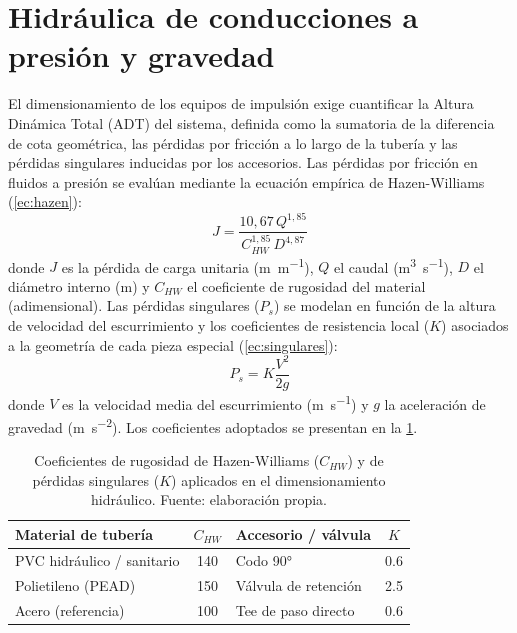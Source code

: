 \section{Hidráulica de conducciones a presión y gravedad}
\label{sec:mt-hidraulico}

El dimensionamiento de los equipos de impulsión exige cuantificar la Altura Dinámica Total (ADT) del sistema, definida como la sumatoria de la diferencia de cota geométrica, las pérdidas por fricción a lo largo de la tubería y las pérdidas singulares inducidas por los accesorios.
Las pérdidas por fricción en fluidos a presión se evalúan mediante la ecuación empírica de Hazen-Williams (\cref{ec:hazen}):
\begin{equation}
  J = \frac{10{,}67\, Q^{1{,}85}}{C_{HW}^{1{,}85}\, D^{4{,}87}}
  \label{ec:hazen}
\end{equation}
donde $J$ es la pérdida de carga unitaria (\unit{\meter\per\meter}), $Q$ el caudal (\unit{\cubic\meter\per\second}), $D$ el diámetro interno (\unit{\meter}) y $C_{HW}$ el coeficiente de rugosidad del material (adimensional).
Las pérdidas singulares ($P_s$) se modelan en función de la altura de velocidad del escurrimiento y los coeficientes de resistencia local ($K$) asociados a la geometría de cada pieza especial (\cref{ec:singulares}):
\begin{equation}
  P_s = K \frac{V^2}{2g}
  \label{ec:singulares}
\end{equation}
donde $V$ es la velocidad media del escurrimiento (\unit{\meter\per\second}) y $g$ la aceleración de gravedad (\unit{\meter\per\square\second}).
Los coeficientes adoptados se presentan en la \cref{tab:coeficientes-hidraulicos}.

\begin{table}[htbp]
  \centering
  \caption{Coeficientes de rugosidad de Hazen-Williams ($C_{HW}$) y de pérdidas singulares ($K$) aplicados en el dimensionamiento hidráulico. Fuente: elaboración propia.}
  \label{tab:coeficientes-hidraulicos}
  \begin{tabular}{lclc}
    \toprule
    Material de tubería & $C_{HW}$ & Accesorio / válvula & $K$ \\
    \midrule
    PVC hidráulico / sanitario & 140 & Codo \ang{90} & \num{0.6} \\
    Polietileno (PEAD) & 150 & Válvula de retención & \num{2.5} \\
    Acero (referencia) & 100 & Tee de paso directo & \num{0.6} \\
    \bottomrule
  \end{tabular}
\end{table}

